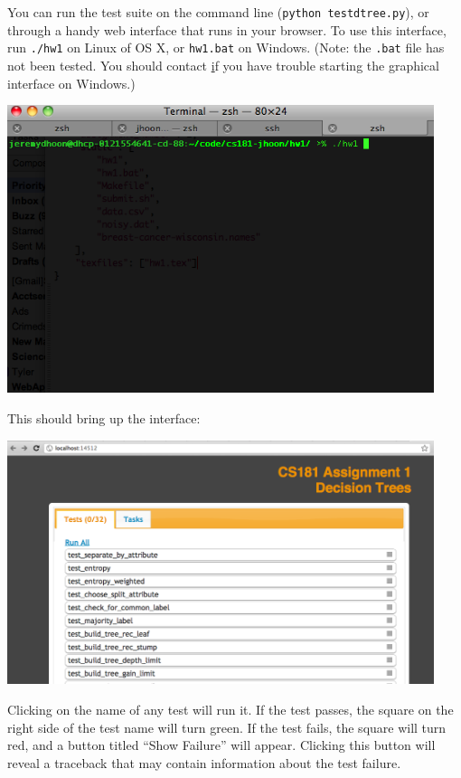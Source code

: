 \documentclass{article}
\begin{document}
\begin{enumerate}
You can run the test suite on the command line
(\verb=python testdtree.py=), or through a handy web interface that
runs in your browser. To use this interface, run \verb=./hw1= on Linux
of OS X, or \verb=hw1.bat= on Windows. (Note: the \verb=.bat= file has
not been tested. You should contact
\href{mailto:cs181@fas.harvard.edu} if you have trouble starting the
graphical interface on Windows.) 

\begin{center}
\includegraphics[width=125mm]{running_webface.png}
\end{center}

This should bring up the interface:

\begin{center}
\includegraphics[width=125mm]{test_screen.png}
\end{center}

Clicking on the name of any test will run it. If the test passes, the
square on the right side of the test name will turn green. If the test
fails, the square will turn red, and a button titled ``Show Failure''
will appear. Clicking this button will reveal a traceback that may
contain information about the test failure.\\


\end{enumerate}
\end{document}
